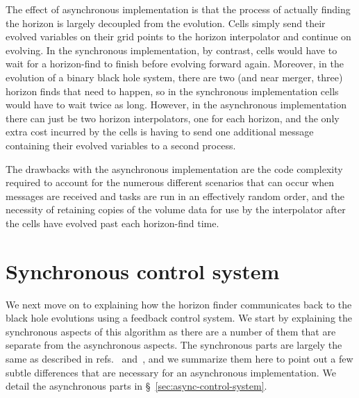\begin{bibunit}[unsrtnat]
The effect of asynchronous implementation is that the process of actually
finding the horizon is largely decoupled from the evolution. Cells simply send
their evolved variables on their grid points to the horizon interpolator and
continue on evolving. In the synchronous implementation, by contrast, cells
would have to wait for a horizon-find to finish before evolving forward again.
Moreover, in the evolution of a binary black hole system, there are two (and
near merger, three) horizon
finds that need to happen, so in the synchronous implementation cells would have
to wait twice as long. However, in the asynchronous implementation there can
just be two horizon interpolators, one for each horizon, and the only extra cost
incurred by the cells is having to send one additional message containing their
evolved variables to a second process.

The drawbacks with the asynchronous implementation are the code complexity
required to account for the numerous different scenarios that can occur when
messages are received and tasks are run in an effectively random order, and the
necessity of retaining copies of the volume data for use by the interpolator
after the cells have evolved past each horizon-find time.

\section{Synchronous control system\label{sec:sync-control-system}}

We next move on to explaining how the horizon finder communicates back to the
black hole evolutions using a feedback control system. We start by explaining
the synchronous aspects of this algorithm as there are a number of them that are
separate from the asynchronous aspects. The synchronous parts are largely the
same as described in refs.~\cite{Scheel:2006gg} and~\cite{Hemberger:2012jz}, and
we summarize them here to point out a few subtle differences that are necessary
for an asynchronous implementation.  We detail the asynchronous parts in
\S~\ref{sec:async-control-system}.


\end{bibunit}
